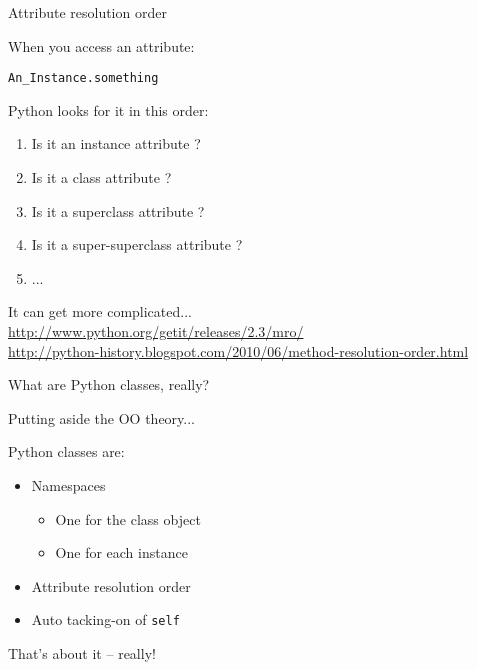 \documentclass{beamer}
\begin{document}
\begin{frame}[fragile]{Attribute resolution order}

{\Large When you access an attribute:

\vfill
\hspace{0.2in}\verb|An_Instance.something|}

\vfill
{\Large Python looks for it in this order:}

\vfill
\begin{enumerate}
  \item Is it an instance attribute ?
  \item Is it a class attribute ?
  \item Is it a superclass attribute ?
  \item Is it a super-superclass attribute ?
  \item ...
\end{enumerate}

\vfill
It can get more complicated...\\
{\small
\url{http://www.python.org/getit/releases/2.3/mro/} \\
\url{http://python-history.blogspot.com/2010/06/method-resolution-order.html}
}
\end{frame} 

\begin{frame}[fragile]{What are Python classes, really?}

{\Large Putting aside the OO theory...}

\vfill
{\Large Python classes are:}

\begin{itemize}
  \item Namespaces
  \begin{itemize}
    \item One for the class object
    \item One for each instance
  \end{itemize}
  \item Attribute resolution order
  \item Auto tacking-on of \verb|self|
\end{itemize}

\vfill
{\Large That's about it -- really!}

\end{frame} 
\end{document}
